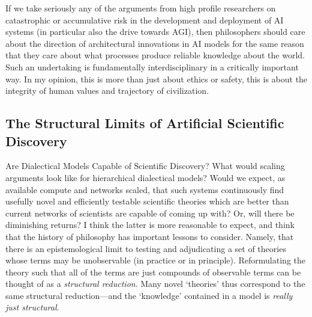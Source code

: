 \documentclass[11pt, oneside]{article}   	%
\begin{document}
If we take seriously any of the arguments from high profile researchers on catastrophic or accumulative risk in the development and deployment of AI systems (in particular also the drive towards AGI), then philosophers should care about the direction of architectural innovations in AI models for the same reason that they care about what processes produce reliable knowledge about the world.  Such an undertaking is fundamentally interdisciplinary in a critically important way.  In my opinion, this is more than just about ethics or safety, this is about the integrity of human values and trajectory of civilization.



\subsection{The Structural Limits of Artificial Scientific Discovery}





Are Dialectical Models Capable of Scientific Discovery?  What would scaling arguments look like for hierarchical dialectical models?  Would we expect, as available compute and networks scaled, that such systems continuously find usefully novel and efficiently testable scientific theories which are better than current networks of scientists are capable of coming up with?  Or, will there be diminishing returns?  I think the latter is more reasonable to expect, and think that the history of philosophy has important lessons to consider.  Namely, that there is an epistemological limit to testing and adjudicating a set of theories whose terms may be unobservable (in practice or in principle).  Reformulating the theory such that all of the terms are just compounds of observable terms can be thought of as a \emph{structural reduction}.  Many novel `theories' thus correspond to the same structural reduction---and the `knowledge' contained in a model is \emph{really just structural}.
\end{document}
